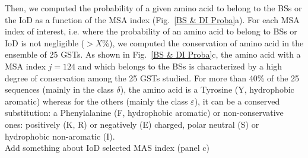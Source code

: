 Then, we computed the probability of a given amino acid to belong to the BSs or the IoD as a function of the MSA index (Fig.~\ref{BS & DI Proba}a). For each MSA index of interest, i.e. where the probability of an amino acid to belong to BSs or IoD is not negligible ($> X\%$), we computed the conservation of amino acid in the ensemble of 25 GSTs. As shown in Fig.~\ref{BS & DI Proba}c,  the amino acid with a MSA index $j=124$ and which belongs to the BSs is characterized by a high degree of conservation among the 25 GSTs  studied. For more than 40\% of the 25 sequences (mainly in the class $\delta$), the amino acid is a Tyrosine (Y, hydrophobic aromatic) whereas for the others (mainly the class $\varepsilon$), it can be a conserved substitution: a Phenylalanine (F, hydrophobic aromatic) or non-conservative ones: positively (K, R) or negatively (E) charged, polar neutral (S) or hydrophobic non-aromatic (I).\\

Add something about IoD selected MAS index (panel c)

